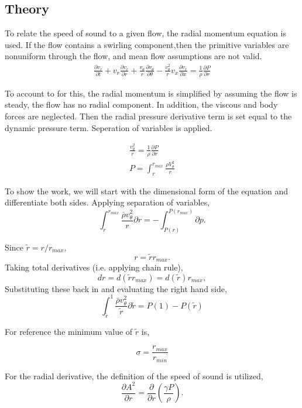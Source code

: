 
\subsection{Theory}

To relate the speed of sound to a given flow, the radial momentum equation
is used.  If the flow contains a swirling component,then the primitive variables 
are nonuniform through the flow, and mean flow assumptions are not valid. 
\begin{align*}
    \frac{\partial v_r}{\partial t} +
    v_r \frac{\partial v_r}{\partial r} + 
    \frac{v_{\theta}}{r} 
    \frac{\partial v_{\theta}}{\partial \theta} -
    \frac{v_{\theta}^2}{r} 
    v_x \frac{\partial v_r}{\partial x} =
    \frac{1}{\rho}\frac{\partial P}{\partial r}
\end{align*}

 To account to for this, the radial momentum is simplified by assuming the 
 flow is steady, the flow has no radial component. In addition, the viscous
 and body forces are neglected.  Then the radial pressure derivative term is
 set equal to the dynamic pressure term. Seperation of variables is applied.  

 \begin{align*}
     \frac{v_{\theta}^2}{r} = \frac{1}{\rho}\frac{\partial P}{\partial r} \\
 P = \int_{r}^{r_{max}} \frac{\rho V_{\theta}^2}{  r}
 \end{align*}

To show the work, we will start with the dimensional form of the equation and
differentiate both sides.  Applying separation of variables,
 \[
     \int_{r}^{r_{max}}
     \frac{\bar{\rho} v_{\theta}^2}{r} \partial r 
     =-\int_{P(r)}^{P(r_{max})}\partial p.
 \]

Since $\tilde{r} = r/r_{max}$,
\[r = \tilde{r}r_{max}.\]
Taking total derivatives (i.e. applying chain rule),
\[dr = d(\tilde{r}r_{max}) = d(\tilde{r})r_{max}, \]
Substituting these back in and evaluating the right hand side,
\[
    \int_{\tilde{r}}^{1} \frac{\bar{\rho} v_{\theta}^2}{\tilde{r}}\partial \tilde{r} 
    =P(1)-P(\tilde{r})
\]

For reference the minimum value of $\tilde{r}$ is,

\[\sigma = \frac{r_{max}}{r_{min}}\]

For the radial derivative, the definition of the speed of sound is utilized,
\[\frac{\partial A^2}{\partial r } =
\frac{\partial}{\partial r} \left( \frac{\gamma P}{\rho} \right).\]

